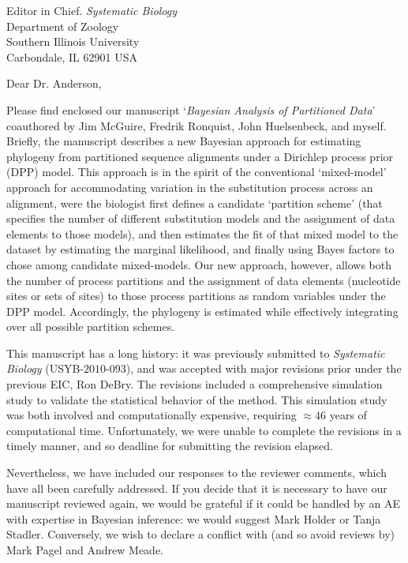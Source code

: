 \documentclass[10pt]{letter}
\begin{document}
\begin{letter}{Editor in Chief. \emph{Systematic Biology} \\
Department of Zoology \\
Southern Illinois University \\
Carbondale, IL 62901 USA}
\signature{Brian R. Moore} 

\opening{Dear Dr. Anderson,} 
 
Please find enclosed our manuscript `\emph{Bayesian Analysis of Partitioned Data}' coauthored by Jim McGuire, Fredrik Ronquist, John Huelsenbeck, and myself.
Briefly, the manuscript describes a new Bayesian approach for estimating phylogeny from partitioned sequence alignments under a Dirichlep process prior (DPP) model.
This approach is in the spirit of the conventional `mixed-model' approach for accommodating variation in the substitution process across an alignment, were the biologist first defines a candidate `partition scheme' (that specifies the number of different substitution models and the assignment of data elements to those models), and then estimates the fit of that mixed model to the dataset by estimating the marginal likelihood, and finally using Bayes factors to chose among candidate mixed-models.
Our new approach, however, allows both the number of process partitions and the assignment of data elements (nucleotide sites or sets of sites) to those process partitions as random variables under the DPP model.
Accordingly, the phylogeny is estimated while effectively integrating over all possible partition schemes.
  
This manuscript has a long history: it was previously submitted to \emph{Systematic Biology} (USYB-$2010$-$093$), and was accepted with major revisions prior under the previous EIC, Ron DeBry.
The revisions included a comprehensive simulation study to validate the statistical behavior of the method.
This simulation study was both involved and computationally expensive, requiring $\approx 46$ years of computational time.
Unfortunately, we were unable to complete the revisions in a timely manner, and so deadline for submitting the revision elapsed.

Nevertheless, we have included our responses to the reviewer comments, which have all been carefully addressed.
If you decide that it is necessary to have our manuscript reviewed again, we would be grateful if it could be handled by an AE with expertise in Bayesian inference:
we would suggest Mark Holder or Tanja Stadler.
Conversely, we wish to declare a conflict with (and so avoid reviews by) Mark Pagel and Andrew Meade.


\end{letter}
\end{document}
